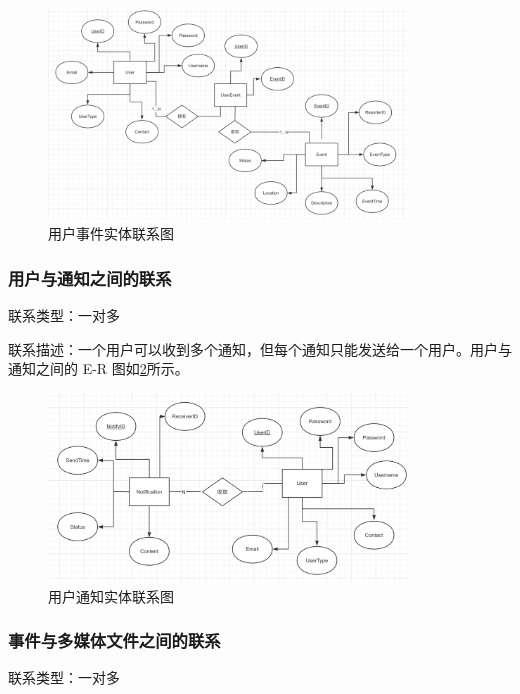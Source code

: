 \begin{figure}[htbp]
    \centering
    \includegraphics[width=0.85\textwidth]{figures/db-img-rela-01.png}
    \caption{用户事件实体联系图}
    \label{fig:rela-user-event}
\end{figure}

\subsubsection{用户与通知之间的联系}

联系类型：一对多

联系描述：一个用户可以收到多个通知，但每个通知只能发送给一个用户。用户与通知之间的 E-R 图如\cref{fig:rela-user-notification}所示。

\begin{figure}[htbp]
    \centering
    \includegraphics[width=0.85\textwidth]{figures/db-img-rela-02.png}
    \caption{用户通知实体联系图}
    \label{fig:rela-user-notification}
\end{figure}

\subsubsection{事件与多媒体文件之间的联系}

联系类型：一对多

